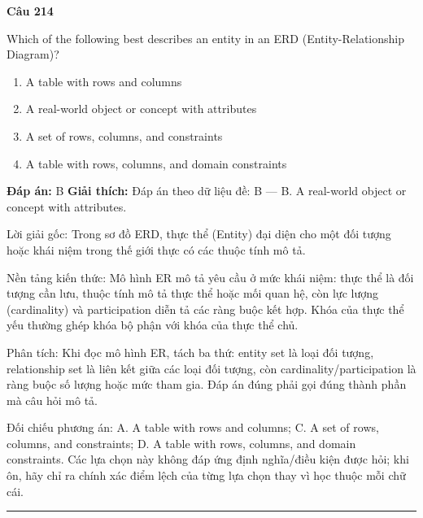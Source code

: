 \documentclass[11pt,a4paper]{article}
\newenvironment{question}[1]{%
  \par\vspace{1em}\noindent\textbf{\large Câu #1}\par\vspace{0.4em}
}{%
  \par\vspace{1em}\hrule\vspace{0.6em}
}
\newenvironment{choices}{%
  \begin{enumerate}[label=\textbf{\Alph*.},leftmargin=2.2em,itemsep=2pt,topsep=3pt]
}{%
  \end{enumerate}
}
\newcommand{\choice}{\item}
\begin{document}
\begin{question}{214}
Which of the following best describes an entity in an ERD (Entity-Relationship Diagram)?
\begin{choices}
\choice A table with rows and columns
\choice A real-world object or concept with attributes
\choice A set of rows, columns, and constraints
\choice A table with rows, columns, and domain constraints
\end{choices}
\textbf{Đáp án:} B
\textbf{Giải thích:} Đáp án theo dữ liệu đề: B — B. A real-world object or concept with attributes.

Lời giải gốc: Trong sơ đồ ERD, thực thể (Entity) đại diện cho một đối tượng hoặc khái niệm trong thế giới thực có các thuộc tính mô tả.

Nền tảng kiến thức: Mô hình ER mô tả yêu cầu ở mức khái niệm: thực thể là đối tượng cần lưu, thuộc tính mô tả thực thể hoặc mối quan hệ, còn lực lượng (cardinality) và participation diễn tả các ràng buộc kết hợp. Khóa của thực thể yếu thường ghép khóa bộ phận với khóa của thực thể chủ.

Phân tích: Khi đọc mô hình ER, tách ba thứ: entity set là loại đối tượng, relationship set là liên kết giữa các loại đối tượng, còn cardinality/participation là ràng buộc số lượng hoặc mức tham gia. Đáp án đúng phải gọi đúng thành phần mà câu hỏi mô tả.

Đối chiếu phương án: A. A table with rows and columns; C. A set of rows, columns, and constraints; D. A table with rows, columns, and domain constraints. Các lựa chọn này không đáp ứng định nghĩa/điều kiện được hỏi; khi ôn, hãy chỉ ra chính xác điểm lệch của từng lựa chọn thay vì học thuộc mỗi chữ cái.
\end{question}
\end{document}
